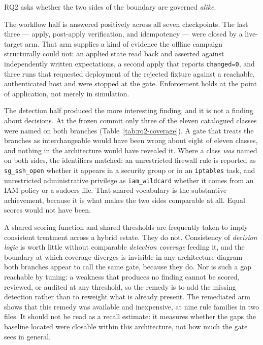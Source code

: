 RQ2 asks whether the two sides of the boundary are governed \emph{alike}.

The workflow half is answered positively across all seven checkpoints. The last
three --- apply, post-apply verification, and idempotency --- were closed by a live-target arm. That arm supplies a kind of evidence
the offline campaign structurally could not: an applied state read back and
asserted against independently written expectations, a second apply that reports
\texttt{changed=0}, and three runs that requested deployment of the rejected
fixture against a reachable, authenticated host and were stopped at the gate.
Enforcement holds at the point of application, not merely in simulation.

The detection half produced the more interesting finding, and it is not a
finding about decisions. At the frozen commit only three of the eleven
catalogued classes were named on both branches
(Table~\ref{tab:rq2-coverage}). A gate that treats the branches as
interchangeable would have been wrong about eight of eleven classes, and nothing
in the architecture would have revealed it. Where a class \emph{was} named on
both sides, the identifiers matched: an unrestricted firewall rule is reported as
\texttt{sg\_ssh\_open} whether it appears in a security group or in an
\texttt{iptables} task, and unrestricted administrative privilege as
\texttt{iam\_wildcard} whether it comes from an IAM policy or a sudoers file.
That shared vocabulary is the substantive achievement, because it is what makes
the two sides comparable at all. Equal scores would not have been.

A shared scoring
function and shared thresholds are frequently taken to imply consistent
treatment across a hybrid estate. They do not. Consistency of \emph{decision
logic} is worth little without comparable \emph{detection coverage} feeding it,
and the boundary at which coverage diverges is invisible in any architecture
diagram --- both branches appear to call the same gate, because they do. Nor is
such a gap reachable by tuning: a weakness that produces no finding cannot be
scored, reviewed, or audited at any threshold, so the remedy is to add the
missing detection rather than to reweight what is already present. The
remediated arm shows that this remedy was available and inexpensive, at nine
rule families in two files. It should not be read as a recall estimate: it
measures whether the gaps the baseline located were closable within this
architecture, not how much the gate sees in general.

